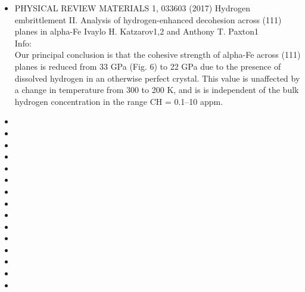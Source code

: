 \documentclass[11pt,floatfix,showpacs]{amsart}
\begin{document}
\begin{itemize}
\item PHYSICAL REVIEW MATERIALS 1, 033603 (2017)
Hydrogen embrittlement II. Analysis of hydrogen-enhanced decohesion across (111) planes in alpha-Fe
Ivaylo H. Katzarov1,2 and Anthony T. Paxton1\\
Info:\\
Our principal conclusion is that the cohesive strength of alpha-Fe across (111) planes is reduced from 33 GPa (Fig. 6) to 22 GPa due to the presence of dissolved hydrogen in an otherwise perfect crystal. This value is unaffected by a change in temperature from 300 to 200 K, and is is independent of the bulk hydrogen concentration in the range CH = 0.1–10 appm.

\item
\item
\item
\item
\item
\item
\item
\item
\item
\item
\item
\item
\item
\item
\item
\end{itemize}
\end{document}
